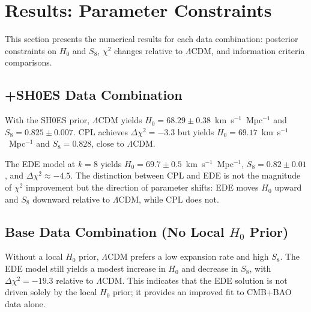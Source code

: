 \documentclass[a4paper,11pt]{article}
\begin{document}

\section{Results: Parameter Constraints}

This section presents the numerical results for each data combination: posterior constraints on $H_0$ and $S_8$, $\chi^2$ changes relative to $\Lambda$CDM, and information criteria comparisons.


\subsection{+SH0ES Data Combination}
\label{sec:shoes_results}

With the SH0ES prior, $\Lambda$CDM yields $H_0 = 68.29 \pm 0.38$~km~s$^{-1}$~Mpc$^{-1}$ and $S_8 = 0.825 \pm 0.007$. CPL achieves $\Delta\chi^2 = -3.3$ but yields $H_0 = 69.17$~km~s$^{-1}$~Mpc$^{-1}$ and $S_8 = 0.828$, close to $\Lambda$CDM.

The EDE model at $k = 8$ yields $H_0 = 69.7 \pm 0.5$~km~s$^{-1}$~Mpc$^{-1}$, $S_8 = 0.82 \pm 0.01$, and $\Delta\chi^2 \approx -4.5$. The distinction between CPL and EDE is not the magnitude of $\chi^2$ improvement but the direction of parameter shifts: EDE moves $H_0$ upward and $S_8$ downward relative to $\Lambda$CDM, while CPL does not.


\subsection{Base Data Combination (No Local $H_0$ Prior)}
\label{sec:base_results}

Without a local $H_0$ prior, $\Lambda$CDM prefers a low expansion rate and high $S_8$. The EDE model still yields a modest increase in $H_0$ and decrease in $S_8$, with $\Delta\chi^2 = -19.3$ relative to $\Lambda$CDM. This indicates that the EDE solution is not driven solely by the local $H_0$ prior; it provides an improved fit to CMB+BAO data alone.
\end{document}
